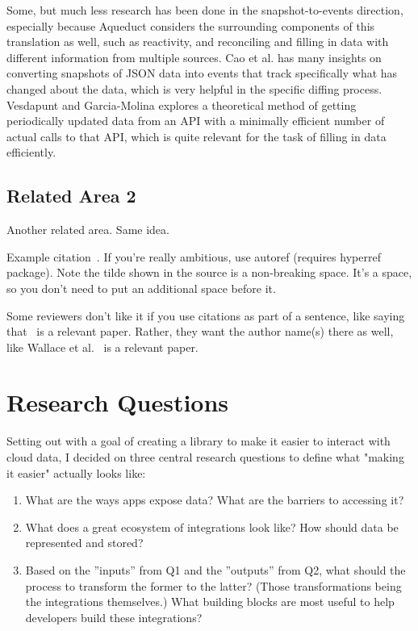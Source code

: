 \documentclass[manuscript,review,anonymous]{acmart}
\begin{document}
Some, but much less research has been done in the snapshot-to-events direction, especially because Aqueduct considers the surrounding components of this translation as well, such as reactivity, and reconciling and filling in data with different information from multiple sources. Cao et al. has many insights on converting snapshots of JSON data into events that track specifically what has changed about the data, which is very helpful in the specific diffing process.~\cite{caoJSONPatchTurning2016} Vesdapunt and Garcia-Molina explores a theoretical method of getting periodically updated data from an API with a minimally efficient number of actual calls to that API, which is quite relevant for the task of filling in data efficiently.~\cite{vesdapuntUpdatingExistingSocial2016}

\subsection{Related Area 2}
Another related area.
Same idea.

Example citation~\cite{wallace2017drafty}. If you're really ambitious, use autoref (requires hyperref package). Note the tilde shown in the source is a non-breaking space. It's a space, so you don't need to put an additional space before it.

Some reviewers don't like it if you use citations as part of a sentence, like saying that~\cite{wallace2017drafty} is a relevant paper. Rather, they want the author name(s) there as well, like Wallace et al.~\cite{wallace2017drafty} is a relevant paper.

\section{Research Questions}
Setting out with a goal of creating a library to make it easier to interact with cloud data, I decided on three central research questions to define what "making it easier" actually looks like:
\begin{enumerate}
  \item What are the ways apps expose data? What are the barriers to accessing it?
  \item What does a great ecosystem of integrations look like? How should data be represented and stored?
  \item Based on the ”inputs” from Q1 and the ”outputs” from Q2, what should the process to transform the former to the latter? (Those transformations being the integrations themselves.) What building blocks are most useful to help developers build these integrations?
\end{enumerate}
\end{document}
